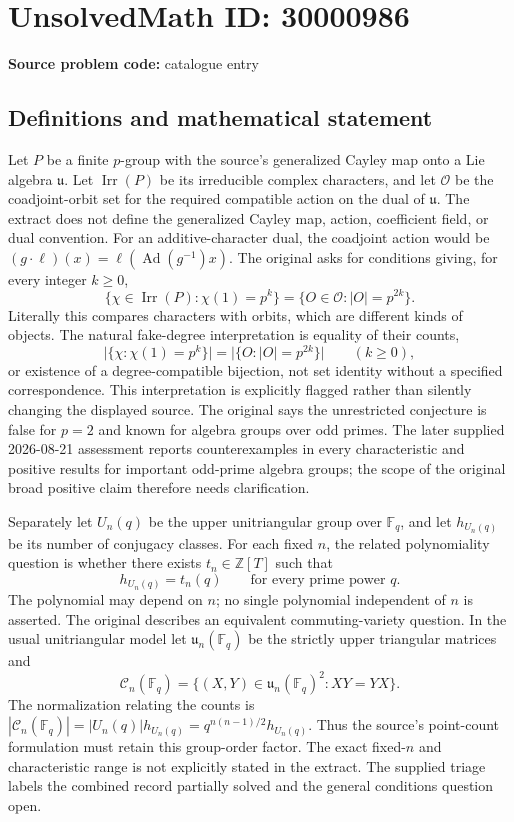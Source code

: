 \documentclass[11pt]{article}
\newcommand{\Z}{\mathbb{Z}}
\newcommand{\F}{\mathbb{F}}
\begin{document}
\section*{UnsolvedMath ID: 30000986}
\textbf{Source problem code:} catalogue entry
\subsection{Definitions and mathematical statement}
Let $P$ be a finite $p$-group with the source's generalized Cayley map onto a Lie algebra $\mathfrak u$. Let $\operatorname{Irr}(P)$ be its irreducible complex characters, and let $\mathcal O$ be the coadjoint-orbit set for the required compatible action on the dual of $\mathfrak u$. The extract does not define the generalized Cayley map, action, coefficient field, or dual convention. For an additive-character dual, the coadjoint action would be $(g\cdot\ell)(x)=\ell(\operatorname{Ad}(g^{-1})x)$. The original asks for conditions giving, for every integer $k\geq0$, \[\{\chi\in\operatorname{Irr}(P):\chi(1)=p^k\}=\{O\in\mathcal O:|O|=p^{2k}\}.\] Literally this compares characters with orbits, which are different kinds of objects. The natural fake-degree interpretation is equality of their counts, \[\bigl|\{\chi:\chi(1)=p^k\}\bigr|=\bigl|\{O:|O|=p^{2k}\}\bigr|\qquad(k\geq0),\] or existence of a degree-compatible bijection, not set identity without a specified correspondence. This interpretation is explicitly flagged rather than silently changing the displayed source. The original says the unrestricted conjecture is false for $p=2$ and known for algebra groups over odd primes. The later supplied 2026-08-21 assessment reports counterexamples in every characteristic and positive results for important odd-prime algebra groups; the scope of the original broad positive claim therefore needs clarification.\par Separately let $U_n(q)$ be the upper unitriangular group over $\F_q$, and let $h_{U_n(q)}$ be its number of conjugacy classes. For each fixed $n$, the related polynomiality question is whether there exists $t_n\in\Z[T]$ such that \[h_{U_n(q)}=t_n(q)\qquad\text{for every prime power }q.\] The polynomial may depend on $n$; no single polynomial independent of $n$ is asserted. The original describes an equivalent commuting-variety question. In the usual unitriangular model let $\mathfrak u_n(\F_q)$ be the strictly upper triangular matrices and \[\mathcal C_n(\F_q)=\{(X,Y)\in\mathfrak u_n(\F_q)^2:XY=YX\}.\] The normalization relating the counts is $|\mathcal C_n(\F_q)|=|U_n(q)|h_{U_n(q)}=q^{n(n-1)/2}h_{U_n(q)}$. Thus the source's point-count formulation must retain this group-order factor. The exact fixed-$n$ and characteristic range is not explicitly stated in the extract. The supplied triage labels the combined record partially solved and the general conditions question open.
\end{document}
